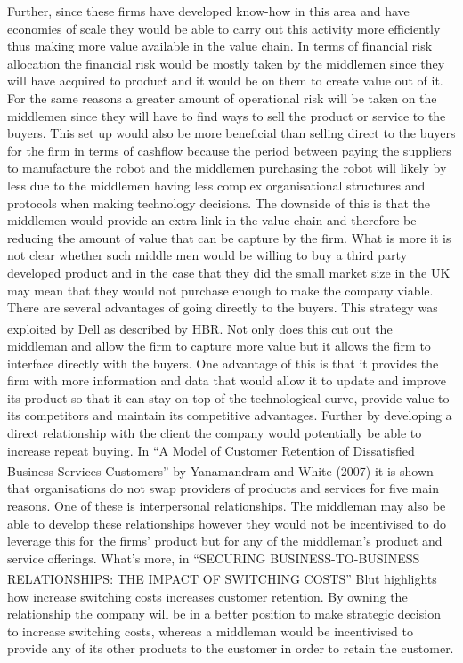 \documentclass[11pt]{article}		%
\newcommand{\supercite}[1]{\textsuperscript{\cite{#1}}}		%
\begin{document}
            Further, since these firms have developed know-how in this area and have economies of scale they would be able to carry out this activity more efficiently thus making more value available in the value chain. In terms of financial risk allocation the financial risk would be mostly taken by the middlemen since they will have acquired to product and it would be on them to create value out of it. For the same reasons a greater amount of operational risk will be taken on the middlemen since they will have to find ways to sell the product or service to the buyers. This set up would also be more beneficial than selling direct to the buyers for the firm in terms of cashflow because the period between paying the suppliers to manufacture the robot and the middlemen purchasing the robot will likely by less due to the middlemen having less complex organisational structures and protocols when making technology decisions. The downside of this is that the middlemen would provide an extra link in the value chain and therefore be reducing the amount of value that can be capture by the firm. What is more it is not clear whether such middle men would be willing to buy a third party developed product and in the case that they did the small market size in the UK may mean that they would not purchase enough to make the company viable. 
            \\
            There are several advantages of going directly to the buyers. This strategy was exploited by Dell as described by HBR.\supercite{business_model}  Not only does this cut out the middleman and allow the firm to capture more value but it allows the firm to interface directly with the buyers. One advantage of this is that it provides the firm with more information and data that would allow it to update and improve its product so that it can stay on top of the technological curve, provide value to its competitors and maintain its competitive advantages. Further by developing a direct relationship with the client the company would potentially be able to increase repeat buying. In “A Model of Customer Retention of Dissatisfied Business Services Customers” by Yanamandram and White (2007)\supercite{customers} it is shown that organisations do not swap providers of products and services for five main reasons. One of these is interpersonal relationships. The middleman may also be able to develop these relationships however they would not be incentivised to do leverage this for the firms’ product but for any of the middleman’s product and service offerings. What’s more, in “SECURING BUSINESS-TO-BUSINESS RELATIONSHIPS:  THE IMPACT OF SWITCHING COSTS”\supercite{B2Brelations} Blut highlights how increase switching costs increases customer retention. By owning the relationship the company will be in a better position to make strategic decision to increase switching costs, whereas a middleman would be incentivised to provide any of its other products to the customer in order to retain the customer.
\end{document}
